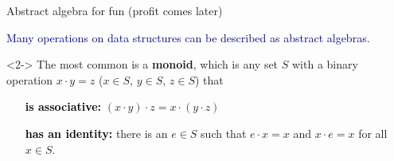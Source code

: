\documentclass[aspectratio=169]{beamer}
\begin{document}
\begin{frame}{Abstract algebra for fun (profit comes later)}
\vspace{0.5 cm}
\large

\textcolor{darkblue}{Many operations on data structures can be described as abstract algebras.}

\vspace{0.5 cm}
\begin{uncoverenv}<2->
The most common is a {\bf monoid}, which is any set $S$ with a binary operation $x \cdot y = z$ ($x \in S$, $y \in S$, $z \in S$) that

\begin{center}
\begin{minipage}{0.5\linewidth}
\begin{itemize}
\item[\textcolor{black}{\bf is associative:}] $(x \cdot y) \cdot z = x \cdot (y \cdot z)$

\item[\textcolor{black}{\bf has an identity:}] there is an $e \in S$ such that $e \cdot x = x$ and $x \cdot e = x$ for all $x \in S$.
\end{itemize}
\end{minipage}
\end{center}
\end{uncoverenv}

\vspace{0.5 cm}
\end{frame}
\end{document}
